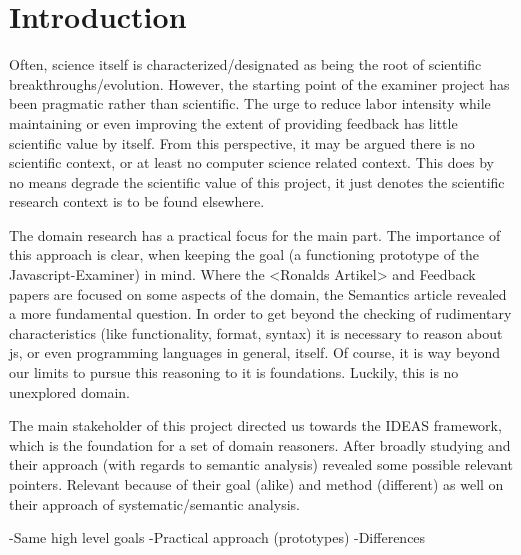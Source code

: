 
\section{Introduction}

Often, science itself is characterized/designated as being the root of 
scientific breakthroughs/evolution. However, the starting point of the 
\gls{examiner} project has been pragmatic rather than scientific. 
The urge to reduce labor intensity while
maintaining or even improving the extent of providing \gls{feedback} has little 
scientific value by itself. From this perspective, it may be argued there is 
no scientific context, or at least no computer science related context. 
This does by no means degrade the scientific value of this project, it just 
denotes the scientific research context is to be found elsewhere. 

The domain research has a practical focus for the main part. The importance of
this approach is clear, when keeping the goal (a functioning prototype
of the Javascript-Examiner) in mind. Where the <Ronalds Artikel> and Feedback
papers are focused on some aspects of the domain, the Semantics article revealed
a more fundamental question. In order to get beyond the checking of rudimentary
characteristics (like functionality, format, syntax) it is necessary to 
reason about \gls{js}, or even programming languages in general, itself. Of
course, it is way beyond our limits to pursue this reasoning to it is 
foundations. Luckily, this is no unexplored domain.


The main stakeholder of this project directed us towards the IDEAS framework,
which is the foundation for a set of domain reasoners. 
After broadly studying \citep{gerdes2012ask} and \citep{heeren2010specifying}
their approach (with regards to semantic analysis) 
revealed some possible relevant pointers. Relevant because of their goal (alike)
and method (different) as well on their approach of systematic/semantic analysis.

-Same high level goals
-Practical approach (prototypes)
-Differences 

